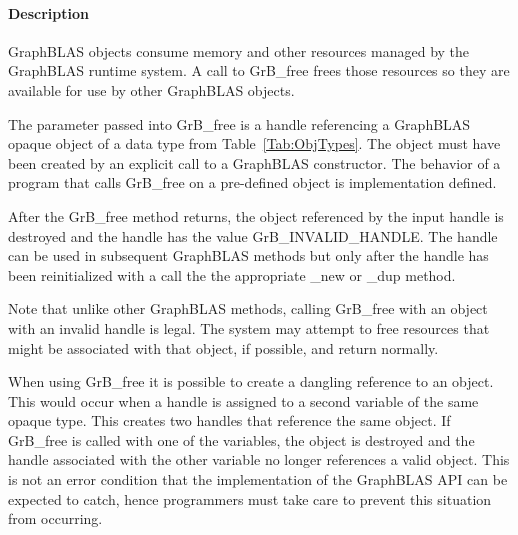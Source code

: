\paragraph{Description}

GraphBLAS objects consume memory and other resources managed by the
GraphBLAS runtime system. A call to {\sf GrB\_free} frees those resources
so they are available for use by other GraphBLAS objects.

The parameter passed into {\sf GrB\_free} is a handle referencing a
GraphBLAS opaque object of a data type from Table~\ref{Tab:ObjTypes}.
The object must have been created by an explicit call to a GraphBLAS
constructor.  The behavior of a program that calls {\sf GrB\_free}
on a pre-defined object is implementation defined.

After the {\sf GrB\_free} method returns, the object referenced
by the input handle is destroyed and the handle has the value {\sf
GrB\_INVALID\_HANDLE}.  The handle can be used in subsequent GraphBLAS
methods but only after the handle has been reinitialized with a call
the the appropriate {\sf \_new} or {\sf \_dup} method.

Note that unlike other GraphBLAS methods, calling {\sf GrB\_free} with
an object with an invalid handle is legal.  The system may attempt to
free resources that might be associated with that object, if possible,
and return normally.

When using {\sf GrB\_free} it is possible to create a dangling reference
to an object.  This would occur when a handle is assigned to a second
variable of the same opaque type.  This creates two handles that reference
the same object. If {\sf GrB\_free} is called with one of the variables,
the object is destroyed and the handle associated with the other variable
no longer references a valid object.  This is not an error condition
that the implementation of the GraphBLAS API can be expected to catch,
hence programmers must take care to prevent this situation from occurring.
